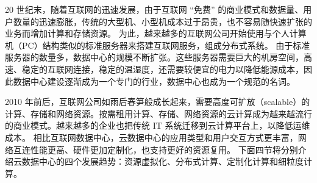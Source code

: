 20 世纪末，随着互联网的迅速发展，由于互联网 ``免费'' 的商业模式和数据量、用户数量的迅速膨胀，传统的大型机、小型机成本过于昂贵，也不容易随快速扩张的业务而增加计算和存储资源。
为此，越来越多的互联网公司开始使用与个人计算机（PC）结构类似的标准服务器来搭建互联网服务，组成分布式系统。
由于标准服务器的数量多，数据中心的规模不断扩张。这些服务器需要巨大的机房空间，高速、稳定的互联网连接，稳定的温湿度，还需要较便宜的电力以降低能源成本，因此数据中心建设逐渐成为一个专门的行业，数据中心也成为一个规范的名词。

2010 年前后，互联网公司如雨后春笋般成长起来，需要高度可扩放（scalable）的计算、存储和网络资源。按需租用计算、存储、网络资源的云计算成为越来越流行的商业模式。越来越多的企业也把传统 IT 系统迁移到云计算平台上，以降低运维成本。
相比互联网数据中心，云数据中心的应用类型和用户交互方式更丰富，网络互连性能更高、硬件更加定制化，也支持更好的资源复用。
下面四节将分别介绍云数据中心的四个发展趋势：资源虚拟化、分布式计算、定制化计算和细粒度计算。

